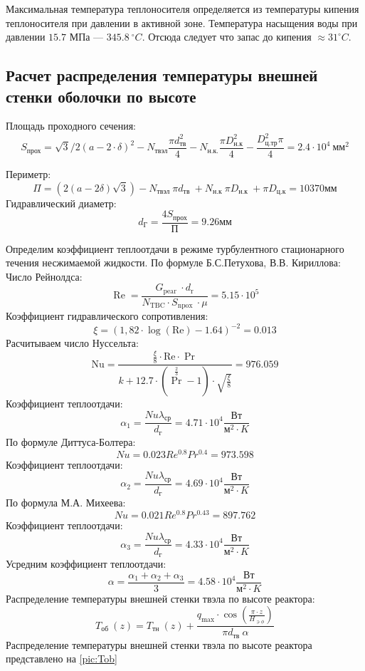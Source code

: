 Максимальная температура теплоносителя определяется из температуры кипения теплоносителя при давлении в активной зоне. Температура насыщения воды при давлении $15.7$ МПа — $345.8\  ^\circ C$. Отсюда следует что запас до кипения $\approx 31 ^\circ C$. 

\subsection{Расчет распределения температуры внешней стенки оболочки по высоте}
Площадь проходного сечения:
$$
S_{\text{прох}} = \sqrt{3}/2(a - 2 \cdot \delta)^2 - N_{\text{твэл}} \frac {\pi d^2_{\text{тв}}} {4} - N_{\text{н.к.}} \frac {\pi D_{\text{н.к}}^2} {4} - \frac {D_{\text{ц.тр}}^2\pi}{4} = 2.4 \cdot 10^4\ \text{мм}^2
$$

Периметр:
$$
\Pi= (2(a-2\delta)\sqrt{3}) - N_{\text {твэл }} \pi d_{\text {тв }}+N_{\text {н.к }} \pi D_{\text {н.к }}+\pi D_{\text {ц.к}}= 10370 \text{мм}
$$
Гидравлический диаметр:
$$
d_{\text{Г}} = \frac {4 S_{\text{прох}}}{\text{П}} = 9.26 \text{мм} 
$$

Определим коэффициент теплоотдачи в режиме турбулентного
стационарного течения несжимаемой жидкости. По формуле Б.С.Петухова, В.В. Кириллова:
    Число Рейнолдса:
    $$
    \operatorname{Re}=\frac{G_{\text {pear }} \cdot d_{\mathrm{r}}}{N_{\mathrm{TBC}} \cdot S_{\text {npox }} \cdot \mu} = 5.15 \cdot 10^5
    $$
    Коэффициент гидравлического сопротивления:
    $$
    \xi=(1,82 \cdot \log (\mathrm{Re})-1.64)^{-2}= 0.013
    $$
    Расчитываем число Нуссельта:
    $$
    \mathrm{Nu}=\frac{\frac{\xi}{8} \cdot \mathrm{Re} \cdot \operatorname{Pr}}{k+12.7 \cdot\left(\operatorname{Pr}^{\frac{2}{3}}-1\right) \cdot \sqrt{\frac{\xi}{8}}} = 976.059 
    $$
    Коэффициент теплоотдачи:
    $$
    \alpha_1 = \frac {Nu \lambda_{\text{ср}}} {d_{\text{г}}} = 4.71 \cdot 10^4 \frac{\text{Вт}}{\text{м}^2 \cdot K}
    $$
    По формуле Диттуса-Болтера:
    $$
    Nu = 0.023Re^{0.8}Pr^{0.4} = 973.598
    $$
    Коэффициент теплоотдачи:
    $$
    \alpha_2 = \frac {Nu \lambda_{\text{ср}}} {d_{\text{г}}} = 4.69 \cdot 10^4 \frac{\text{Вт}}{\text{м}^2 \cdot K}
    $$
    По формула М.А. Михеева:
    $$
    Nu = 0.021Re^{0.8}Pr^{0.43} = 897.762
    $$
    Коэффициент теплоотдачи:
    $$
    \alpha_3 = \frac {Nu \lambda_{\text{ср}}} {d_{\text{г}}} = 4.33 \cdot 10^4 \frac{\text{Вт}}{\text{м}^2 \cdot K}
    $$
    Усредним коэффициент теплоотдачи:
    $$
    \alpha = \frac {\alpha_1 + \alpha_2 + \alpha_3} {3} = 4.58 \cdot 10^4 \frac{\text{Вт}}{\text{м}^2 \cdot K}
    $$
    Распределение температуры внешней стенки твэла по высоте реактора:
    $$
    T_{\text {об }}(z)=T_{\text {тн }}(z)+\frac{q_{\max } \cdot \cos \left(\frac{\pi \cdot z}{H_{\ni \phi}}\right)}{\pi d_{\text {тв }} \alpha}
    $$
Распределение температуры внешней стенки
твэла по высоте реактора представлено на \ref{pic:Tob}

